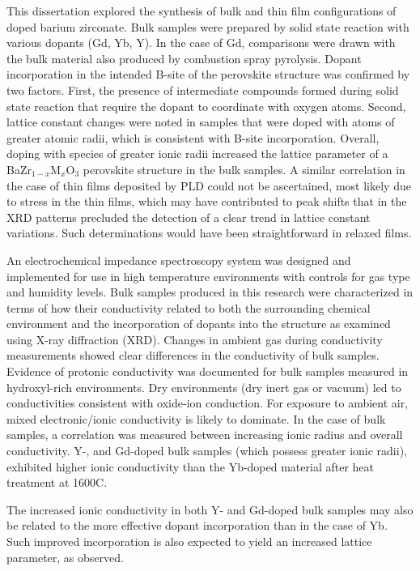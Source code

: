 This dissertation explored the synthesis of bulk and thin film configurations of doped barium zirconate. Bulk samples were prepared by solid state reaction with various dopants (Gd, Yb, Y). In the case of Gd, comparisons were drawn with the bulk material also produced by combustion spray pyrolysis. Dopant incorporation in the intended B-site of the perovskite structure was confirmed by two factors. First, the presence of intermediate compounds formed during solid state reaction that require the dopant to coordinate with oxygen atoms. Second, lattice constant changes were noted in samples that were doped with atoms of greater atomic radii, which is consistent with B-site incorporation. Overall, doping with species of greater ionic radii increased the lattice parameter of a BaZr$_{1-x}$M$_x$O$_3$ perovskite structure in the bulk samples. A similar correlation in the case of thin films deposited by PLD could not be ascertained, most likely due to stress in the thin films, which may have contributed to peak shifts that in the XRD patterns precluded the detection of a clear trend in lattice constant variations. Such determinations would have been straightforward in relaxed films.

An electrochemical impedance spectroscopy system was designed and implemented for use in high temperature environments with controls for gas type and humidity levels. Bulk samples produced in this research were characterized in terms of how their conductivity related to both the surrounding chemical environment and the incorporation of dopants into the structure as examined using X-ray diffraction (XRD). Changes in ambient gas during conductivity measurements showed clear differences in the conductivity of bulk samples. Evidence of protonic conductivity was documented for bulk samples measured in hydroxyl-rich environments. Dry environments (dry inert gas or vacuum) led to conductivities consistent with oxide-ion conduction. For exposure to ambient air, mixed electronic/ionic conductivity is likely to dominate. In the case of bulk samples, a correlation was measured between increasing ionic radius and overall conductivity. Y-, and Gd-doped bulk samples (which possess greater ionic radii), exhibited higher ionic conductivity than the Yb-doped material after heat treatment at 1600\textdegree C.

The increased ionic conductivity in both Y- and Gd-doped bulk samples may also be related to the more effective dopant incorporation than in the case of Yb. Such improved incorporation is also expected to yield an increased lattice parameter, as observed.

